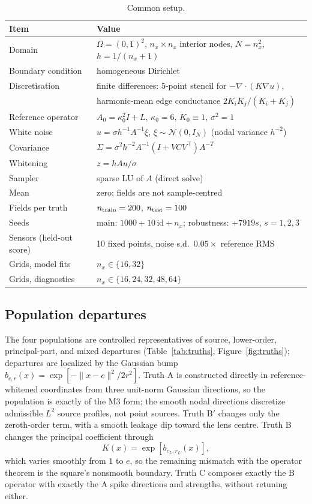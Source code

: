 \documentclass[11pt]{article}
\numberwithin{table}{section}
\numberwithin{figure}{section}
\begin{document}
\begin{table}[htbp]
\centering
\caption{Common setup.}
\label{tab:setup}
\begin{tabular}{@{}ll@{}}
\toprule
Item & Value \\
\midrule
Domain & $\Omega=(0,1)^2$, $n_x\times n_x$ interior nodes, $N=n_x^2$, $h=1/(n_x+1)$ \\
Boundary condition & homogeneous Dirichlet \\
Discretisation & finite differences: 5-point stencil for $-\nabla\!\cdot(K\nabla u)$, \\
 & harmonic-mean edge conductance $2K_iK_j/(K_i+K_j)$ \\
Reference operator & $A_0=\kappa_0^2 I+L$, $\kappa_0=6$, $K_0\equiv 1$, $\sigma^2=1$ \\
White noise & $u=\sigma h^{-1}A^{-1}\xi$, $\xi\sim\mathcal N(0,I_N)$ (nodal variance $h^{-2}$) \\
Covariance & $\Sigma=\sigma^2h^{-2}A^{-1}(I+VCV^\top)A^{-T}$ \\
Whitening & $z=hAu/\sigma$ \\
Sampler & sparse LU of $A$ (direct solve) \\
Mean & zero; fields are not sample-centred \\
Fields per truth & $n_{\rm train}=200$, $n_{\rm test}=100$ \\
Seeds & main: $1000+10\,\mathrm{id}+n_x$; robustness: $+7919s$, $s=1,2,3$ \\
Sensors (held-out score) & 10 fixed points, noise s.d.\ $0.05\times$ reference RMS \\
Grids, model fits & $n_x\in\{16,32\}$ \\
Grids, diagnostics & $n_x\in\{16,24,32,48,64\}$ \\
\bottomrule
\end{tabular}
\end{table}

\subsection{Population departures}
\label{sec:design_truths}

The four populations are controlled representatives of source, lower-order, principal-part, and mixed departures (Table~\ref{tab:truths}, Figure~\ref{fig:truths}); departures are localized by the Gaussian bump $b_{c,r}(x)=\exp[-\|x-c\|^2/2r^2]$. Truth A is constructed directly in reference-whitened coordinates from three unit-norm Gaussian directions, so the population is exactly of the M3 form; the smooth nodal directions discretize admissible $L^2$ source profiles, not point sources. Truth B$'$ changes only the zeroth-order term, with a smooth leakage dip toward the lens centre. Truth B changes the principal coefficient through
\begin{equation}
    K(x)=\exp\!\left[b_{c_L,r_L}(x)\right],
    \label{eq:truthB_K}
\end{equation}
which varies smoothly from $1$ to $e$, so the remaining mismatch with the operator theorem is the square's nonsmooth boundary. Truth C composes exactly the B operator with exactly the A spike directions and strengths, without retuning either.
\end{document}
